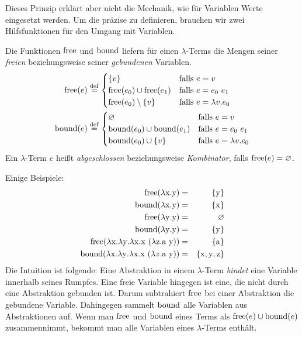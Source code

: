 Dieses Prinzip erklärt aber nicht die Mechanik, wie für Variablen
Werte eingesetzt werden.  Um die präzise zu definieren, brauchen wir
zwei Hilfsfunktionen für den Umgang mit Variablen.
%
\begin{definition}
  Die Funktionen $\operatorname{free}$ und $\operatorname{bound}$ liefern für einen
  $\lambda$-Terms die Mengen seiner \emph{freien} beziehungsweise seiner
  \emph{gebundenen} Variablen.  %
  \begin{align*}
    \operatorname{free}(e) & \stackrel{\rm def}{=}
    \begin{cases}
      \{ v \}  & \text{falls } e  = v\\
      \operatorname{free}(e_0) \cup \operatorname{free}(e_1) & \text{falls } e = e_0~e_1\\
      \operatorname{free}(e_0) \setminus \{v\} & \text{falls } e = \lambda v.e_0
    \end{cases}\\
    \operatorname{bound}(e) & \stackrel{\rm def}{=}
    \begin{cases}
      \varnothing & \text{falls } e = v\\
      \operatorname{bound}(e_0) \cup \operatorname{bound}(e_1) & \text{falls } e = e_0~e_1\\
      \operatorname{bound}(e_0) \cup \{v\} & \text{falls } e = \lambda v.e_0
    \end{cases}
  \end{align*}
  Ein
  $\lambda$-Term $e$ heißt \emph{abgeschlossen} beziehungsweise 
  \textit{Kombinator}, falls $\operatorname{free}(e)=\varnothing$.
\end{definition}
%
Einige Beispiele:
%
\begin{eqnarray*}
  \operatorname{free}(\lambda \mathrm x.\mathrm y) &=& \{\mathrm y\}\\
  \operatorname{bound}(\lambda \mathrm x.\mathrm y) &=& \{\mathrm x\}\\
  \operatorname{free}(\lambda \mathrm y.\mathrm y) &=& \varnothing\\
  \operatorname{bound}(\lambda \mathrm y.\mathrm y) &=& \{\mathrm y\}\\
  \operatorname{free}(\lambda \mathrm x.\lambda \mathrm y.\lambda \mathrm x.\mathrm x~(\lambda \mathrm z.\mathrm a~\mathrm y)) &=& \{ \mathrm a\}\\
  \operatorname{bound}(\lambda \mathrm x.\lambda \mathrm y.\lambda \mathrm x.\mathrm x~(\lambda z.\mathrm a~\mathrm y)) &=& \{ \mathrm x,\mathrm y,\mathrm z\}
\end{eqnarray*}
%
Die Intuition ist folgende: Eine Abstraktion in einem $\lambda$-Term
\emph{bindet} eine Variable innerhalb seines Rumpfes.  Eine freie
Variable hingegen ist eine, die nicht durch eine Abstraktion gebunden
ist.  Darum subtrahiert $\operatorname{free}$ bei einer Abstraktion die gebundene
Variable.  Dahingegen sammelt $\operatorname{bound}$ alle Variablen aus
Abstraktionen auf.  Wenn man $\operatorname{free}$ und $\operatorname{bound}$ eines Terms als
$\operatorname{free}(e)\cup\operatorname{bound}(e)$ zusammennimmt, bekommt man alle Variablen
eines $\lambda$-Terms enthält.

